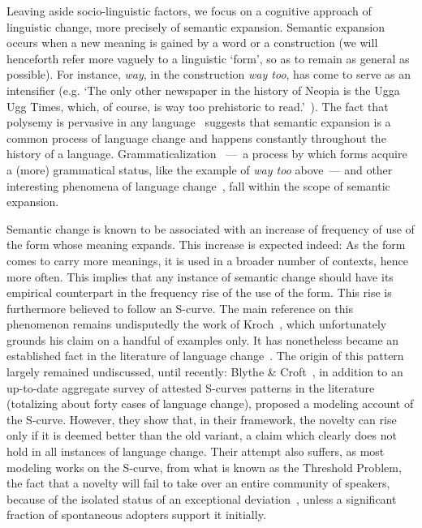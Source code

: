 \documentclass[12pt,twocolumn,amsmath,amssymb,aps,longbibliography]{revtex4-1}  %
\newcommand{\tit}{\textit}
\begin{document}
Leaving aside socio-linguistic factors, we focus on a cognitive approach of linguistic change, more precisely of semantic expansion. Semantic expansion occurs when a new meaning is gained by a word or a construction (we will henceforth refer more vaguely to a linguistic `form', so as to remain as general as possible). For instance, \tit{way}, in the construction \tit{way too}, has come to serve as an intensifier (e.g. `The only other newspaper in the history of Neopia is the Ugga Ugg Times, which, of course, is way too prehistoric to read.'~\cite{neopia}). The fact that polysemy is pervasive in any language~\cite{ploux2010semantic} suggests that semantic expansion is a common process of language change and happens constantly throughout the history of a language. Grammaticalization~\cite{hopper2003grammaticalization} ---~a process by which forms acquire a (more) grammatical status, like the example of \tit{way too} above~--- and other interesting phenomena of language change~\cite{erman1993pragmaticalization,brinton2005lexicalization}, fall within the scope of semantic expansion.

Semantic change is known to be associated with an increase of frequency of use of the form whose meaning expands. This increase is expected indeed: As the form comes to carry more meanings, it is used in a broader number of contexts, hence more often. This implies that any instance of semantic change should have its empirical counterpart in the frequency rise of the use of the form. This rise is furthermore believed to follow an S-curve. The main reference on this phenomenon remains undisputedly the work of Kroch~\cite{kroch1989reflexes}, which unfortunately grounds his claim on a handful of examples only. It has nonetheless became an established fact in the literature of language change~\cite{aitchison2013language}. The origin of this pattern largely remained undiscussed, until recently: Blythe \& Croft~\cite{blythe2012s}, in addition to an up-to-date aggregate survey of attested S-curves patterns in the literature (totalizing about forty cases of language change), proposed a modeling account of the S-curve. However, they show that, in their framework, the novelty can rise only if it is deemed better than the old variant, a claim which clearly does not hold in all instances of language change. Their attempt also suffers, as most modeling works on the S-curve, from what is known as the Threshold Problem, the fact that a novelty will fail to take over an entire community of speakers, because of the isolated status of an exceptional deviation~\cite{nettle1999using}, unless a significant fraction of spontaneous adopters support it initially.
\end{document}
